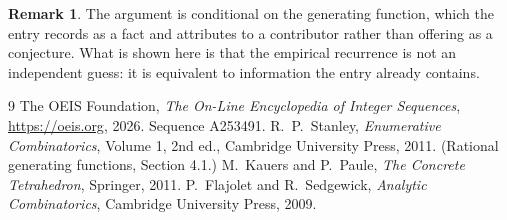 \documentclass[11pt,a4paper]{article}
\theoremstyle{plain}
\theoremstyle{definition}
\newtheorem{remark}[theorem]{Remark}
\begin{document}
\begin{remark}
The argument is conditional on the generating function, which the entry records as a fact and
attributes to a contributor rather than offering as a conjecture. What is shown here is that
the empirical recurrence is not an independent guess: it is equivalent to information the
entry already contains.
\end{remark}

\begin{thebibliography}{9}
 The OEIS Foundation, \emph{The On-Line Encyclopedia of Integer
Sequences}, \url{https://oeis.org}, 2026. Sequence A253491.
 R.~P.~Stanley, \emph{Enumerative Combinatorics}, Volume 1, 2nd ed.,
Cambridge University Press, 2011. (Rational generating functions, Section 4.1.)
 M.~Kauers and P.~Paule, \emph{The Concrete Tetrahedron}, Springer, 2011.
 P.~Flajolet and R.~Sedgewick, \emph{Analytic Combinatorics}, Cambridge
University Press, 2009.
\end{thebibliography}
\end{document}

